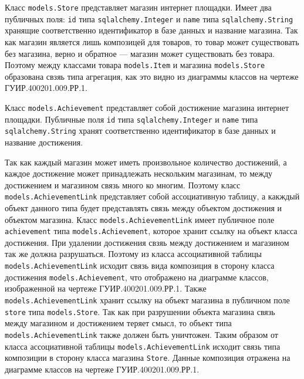 Класс \texttt{models.Store} представляет магазин интернет площадки. Имеет два публичных поля: \texttt{id} типа \texttt{sqlalchemy.Integer} и \texttt{name} типа \texttt{sqlal\-chemy.String} хранящие соответственно идентификатор в базе данных и название магазина. Так как магазин является лишь композицей для товаров, то товар может существовать без магазина, верно и обратное --- магазин может существовать без товара. Поэтому между классами товара \texttt{models.Item} и магазина \texttt{models.Store} образована свзяь типа агрегация, как это видно из диаграммы классов на чертеже ГУИР.400201.009.РР.1.

Класс \texttt{models.Achievement} представляет собой достижение магазина интернет площадки. Публичные поля \texttt{id} типа \texttt{sqlalchemy.Integer} и \texttt{name} типа \texttt{sqlalchemy.String} хранят соответственно идентификатор в базе данных и название достижения.

Так как каждый магазин может иметь произвольное количество достижений, а каждое достижение может принадлежать нескольким магазинам, то между достижением и магазином связь много ко многим. Поэтому класс \texttt{models.AchievementLink} представляет собой ассоциативную таблицу, а какждый объект данного типа будет представлять связь между объектом достижения и объектом магазина. Класс \texttt{models.AchievementLink} имеет публичное поле \texttt{achievement} типа \texttt{models.Achievement}, которое хранит ссылку на объект класса достижения. При удалении достижения свзяь между достижением и магазином так же должна разрушаться. Поэтому из класса ассоциативной таблицы \texttt{models.AchievementLink} исходит связь вида композиция в сторону класса достижения \texttt{models.Achievement}, что отображено на диаграмме классов, изображенной на чертеже ГУИР.400201.009.РР.1. Также \texttt{models.AchievementLink} хранит ссылку на объект магазина в публичном поле \texttt{store} типа \texttt{models.Store}. Так как при разрушении объекта магазина связь между магазином и достижением теряет смысл, то объект типа \texttt{models.AchievementLink} также должен быть уничтожен. Таким образом от класса ассоциативной таблицы \texttt{models.AchievementLink} исходит связь типа композиции в сторону класса магазина \texttt{Store}. Данные композиция отражена на диаграмме классов на чертеже ГУИР.400201.009.РР.1.

